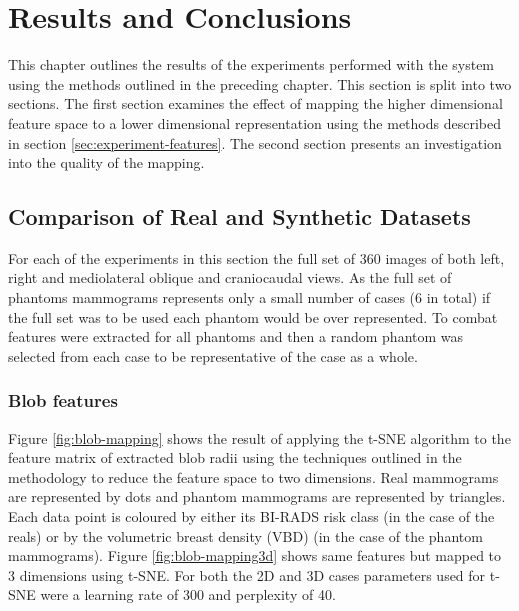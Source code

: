 \chapter{Results and Conclusions}
\label{chap:results}

This chapter outlines the results of the experiments performed with the system using the methods outlined in the preceding chapter. This section is split into two sections. The first section examines the effect of mapping the higher dimensional feature space to a lower dimensional representation using the methods described in section \ref{sec:experiment-features}. The second section presents an investigation into the quality of the mapping.

\section{Comparison of Real and Synthetic Datasets}

For each of the experiments in this section the full set of 360 images of both left, right and mediolateral oblique and craniocaudal views. As the full set of phantoms mammograms represents only a small number of cases (6 in total) if the full set was to be used each phantom would be over represented. To combat features were extracted for all phantoms and then a random phantom was selected from each case to be representative of the case as a whole.

\subsection{Blob features} 

Figure \ref{fig:blob-mapping} shows the result of applying the t-SNE algorithm to the feature matrix of extracted blob radii using the techniques outlined in the methodology to reduce the feature space to two dimensions. Real mammograms are represented by dots and phantom mammograms are represented by triangles. Each data point is coloured by either its BI-RADS risk class (in the case of the reals) or by the volumetric breast density (VBD) (in the case of the phantom mammograms). Figure \ref{fig:blob-mapping3d} shows same features but mapped to 3 dimensions using t-SNE. For both the 2D and 3D cases parameters used for t-SNE were a learning rate of 300 and perplexity of 40.

